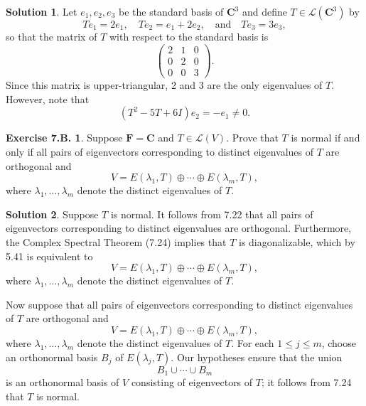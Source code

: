 \documentclass[12pt]{article}
\theoremstyle{definition}
\theoremstyle{exercise}
\newtheorem{exercise}{Exercise 7.B.}
\theoremstyle{solution}
\newtheorem*{solution}{Solution}
\newcommand{\lmap}{\mathcal{L}}
\newcommand{\quand}{\quad \text{and} \quad}
\newcommand{\C}{\mathbf{C}}
\newcommand{\F}{\mathbf{F}}
\begin{document}
\begin{solution}
    Let \( e_1, e_2, e_3 \) be the standard basis of \( \C^3 \) and define \( T \in \lmap(\C^3) \) by
    \[
        T e_1 = 2 e_1, \quad T e_2 = e_1 + 2 e_2, \quand T e_3 = 3 e_3,
    \]
    so that the matrix of \( T \) with respect to the standard basis is
    \[
        \begin{pmatrix}
            2 & 1 & 0 \\
            0 & 2 & 0 \\
            0 & 0 & 3
        \end{pmatrix}.
    \]
    Since this matrix is upper-triangular, 2 and 3 are the only eigenvalues of \( T \). However, note that
    \[
        (T^2 - 5T + 6I) e_2 = -e_1 \neq 0.
    \]
\end{solution}

\begin{exercise}
\label{ex:4}
    Suppose \( \F = \C \) and \( T \in \lmap(V) \). Prove that \( T \) is normal if and only if all pairs of eigenvectors corresponding to distinct eigenvalues of \( T \) are orthogonal and
    \[
        V = E(\lambda_1, T) \oplus \cdots \oplus E(\lambda_m, T),
    \]
    where \( \lambda_1, \ldots, \lambda_m \) denote the distinct eigenvalues of \( T \).
\end{exercise}

\begin{solution}
    Suppose \( T \) is normal. It follows from 7.22 that all pairs of eigenvectors corresponding to distinct eigenvalues are orthogonal. Furthermore, the Complex Spectral Theorem (7.24) implies that \( T \) is diagonalizable, which by 5.41 is equivalent to
    \[
        V = E(\lambda_1, T) \oplus \cdots \oplus E(\lambda_m, T),
    \]
    where \( \lambda_1, \ldots, \lambda_m \) denote the distinct eigenvalues of \( T \).

    Now suppose that all pairs of eigenvectors corresponding to distinct eigenvalues of \( T \) are orthogonal and
    \[
        V = E(\lambda_1, T) \oplus \cdots \oplus E(\lambda_m, T),
    \]
    where \( \lambda_1, \ldots, \lambda_m \) denote the distinct eigenvalues of \( T \). For each \( 1 \leq j \leq m \), choose an orthonormal basis \( B_j \) of \( E(\lambda_j, T) \). Our hypotheses ensure that the union
    \[
        B_1 \cup \cdots \cup B_m
    \]
    is an orthonormal basis of \( V \) consisting of eigenvectors of \( T \); it follows from 7.24 that \( T \) is normal.
\end{solution}
\end{document}
